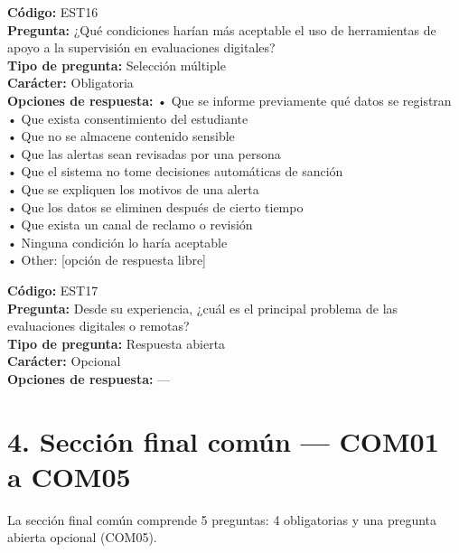 \begin{infobox}\small
\textbf{\textcolor{accent}{Código:}} EST16\\
\textbf{\textcolor{accent}{Pregunta:}} ¿Qué condiciones harían más aceptable el uso de herramientas de apoyo a la supervisión en evaluaciones digitales?\\
\textbf{\textcolor{accent}{Tipo de pregunta:}} Selección múltiple\\
\textbf{\textcolor{accent}{Carácter:}} Obligatoria\\
\textbf{\textcolor{accent}{Opciones de respuesta:}} • Que se informe previamente qué datos se registran \\ • Que exista consentimiento del estudiante \\ • Que no se almacene contenido sensible \\ • Que las alertas sean revisadas por una persona \\ • Que el sistema no tome decisiones automáticas de sanción \\ • Que se expliquen los motivos de una alerta \\ • Que los datos se eliminen después de cierto tiempo \\ • Que exista un canal de reclamo o revisión \\ • Ninguna condición lo haría aceptable \\ • Other: [opción de respuesta libre]\\
\end{infobox}
\begin{infobox}\small
\textbf{\textcolor{accent}{Código:}} EST17\\
\textbf{\textcolor{accent}{Pregunta:}} Desde su experiencia, ¿cuál es el principal problema de las evaluaciones digitales o remotas?\\
\textbf{\textcolor{accent}{Tipo de pregunta:}} Respuesta abierta\\
\textbf{\textcolor{accent}{Carácter:}} Opcional\\
\textbf{\textcolor{accent}{Opciones de respuesta:}} ---\\
\end{infobox}
\section*{4. Sección final común --- COM01 a COM05}
La sección final común comprende 5 preguntas: 4 obligatorias y una pregunta abierta opcional (COM05).

